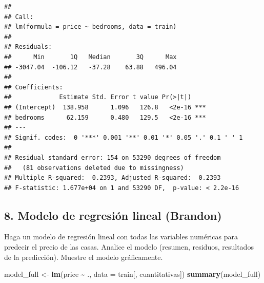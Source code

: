 \documentclass[
]{article}
\newenvironment{Shaded}{\begin{snugshade}}{\end{snugshade}}
\newcommand{\AttributeTok}[1]{\textcolor[rgb]{0.13,0.29,0.53}{#1}}
\newcommand{\FunctionTok}[1]{\textcolor[rgb]{0.13,0.29,0.53}{\textbf{#1}}}
\newcommand{\NormalTok}[1]{#1}
\newcommand{\OtherTok}[1]{\textcolor[rgb]{0.56,0.35,0.01}{#1}}
\newcommand{\SpecialCharTok}[1]{\textcolor[rgb]{0.81,0.36,0.00}{\textbf{#1}}}
\begin{document}
\begin{verbatim}
## 
## Call:
## lm(formula = price ~ bedrooms, data = train)
## 
## Residuals:
##      Min       1Q   Median       3Q      Max 
## -3047.04  -106.12   -37.28    63.88   496.04 
## 
## Coefficients:
##             Estimate Std. Error t value Pr(>|t|)    
## (Intercept)  138.958      1.096   126.8   <2e-16 ***
## bedrooms      62.159      0.480   129.5   <2e-16 ***
## ---
## Signif. codes:  0 '***' 0.001 '**' 0.01 '*' 0.05 '.' 0.1 ' ' 1
## 
## Residual standard error: 154 on 53290 degrees of freedom
##   (81 observations deleted due to missingness)
## Multiple R-squared:  0.2393, Adjusted R-squared:  0.2393 
## F-statistic: 1.677e+04 on 1 and 53290 DF,  p-value: < 2.2e-16
\end{verbatim}

\begin{Shaded}
\end{Shaded}

\subsection{8. Modelo de regresión lineal
(Brandon)}\label{modelo-de-regresiuxf3n-lineal-brandon}

Haga un modelo de regresión lineal con todas las variables numéricas
para predecir el precio de las casas. Analice el modelo (resumen,
residuos, resultados de la predicción). Muestre el modelo gráficamente.

\begin{Shaded}
\begin{Highlighting}[]
\NormalTok{model\_full }\OtherTok{\textless{}{-}} \FunctionTok{lm}\NormalTok{(price }\SpecialCharTok{\textasciitilde{}}\NormalTok{ ., }\AttributeTok{data =}\NormalTok{ train[, cuantitativas])}
\FunctionTok{summary}\NormalTok{(model\_full)}
\end{Highlighting}
\end{Shaded}
\end{document}
